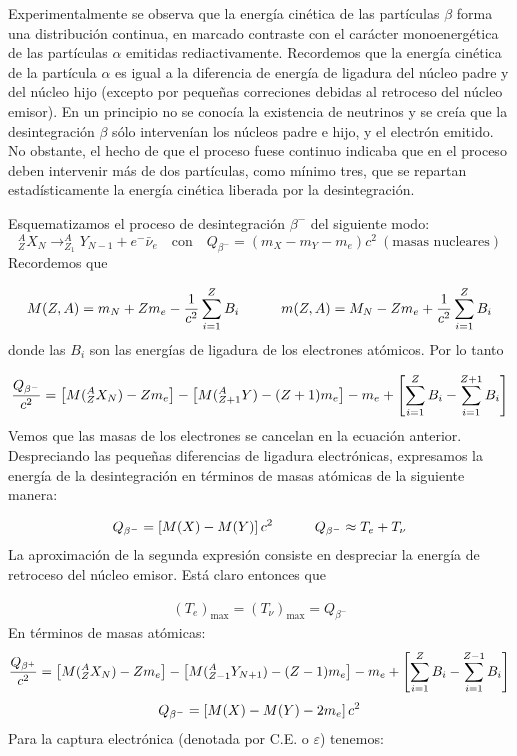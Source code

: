 Experimentalmente se observa que la energía cinética de las partículas $\beta$ forma una distribución continua, en marcado contraste con el carácter monoenergética de las partículas $\alpha$ emitidas rediactivamente. Recordemos que la energía cinética de la partícula $\alpha$ es igual a la diferencia de energía de ligadura del núcleo padre y del núcleo hijo (excepto por pequeñas correciones debidas al retroceso del núcleo emisor). En un principio no se conocía la existencia de neutrinos y se creía que la desintegración $\beta$ sólo intervenían los núcleos padre e hijo, y el electrón emitido. No obstante, el hecho de que el proceso fuese continuo indicaba que en el proceso deben intervenir más de dos partículas, como mínimo tres, que se repartan estadísticamente la energía cinética liberada por la desintegración. 

Esquematizamos el proceso de desintegración $\beta^-$ del siguiente modo:
\begin{equation}
	^A_Z X_N \longrightarrow _{Z_1}^A Y_{N-1} + e^- \bar{\nu}_e \quad \text{con} \quad Q_{\beta^-} = (m_X-m_Y-m_e)c^2 \ (\text{masas nucleares})
\end{equation}
Recordemos que

\begin{equation*}
	M(Z,A) = m_N + Zm_e - \frac{1}{c^2} \sum_{i=1}^Z B_i \quad \quad \quad
	m(Z,A) = M_N - Zm_e + \frac{1}{c^2} \sum_{i=1}^Z B_i
\end{equation*}
donde las $B_i$ son las energías de ligadura de los electrones atómicos. Por lo tanto

\begin{eqnarray}
	\frac{Q_{\beta^-}}{c^2} = \left[ M(^A_ZX_N) - Zm_e \right] - \left[ M(_{Z+1}^A Y)-(Z+1)m_e \right]  - m_e + \left[ \sum_{i=1}^{Z} B_i - \sum_{i=1}^{Z+1} B_i \right]
\end{eqnarray}
Vemos que las masas de los electrones se cancelan en la ecuación anterior. Despreciando las pequeñas diferencias de ligadura electrónicas, expresamos la energía de la desintegración en términos de masas atómicas de la siguiente manera:

\begin{eqnarray}
	Q_ {\beta^-} = \left[ M(X)-M(Y) \right] c^2 \quad \quad \quad Q_{\beta^-} \approx T_e + T_\nu
\end{eqnarray}
La aproximación de la segunda expresión consiste en despreciar la energía de retroceso del núcleo emisor. Está claro entonces que

\begin{eqnarray}
	(T_e)_{\max} = (T_\nu)_{\max} = Q_{\beta^-}
\end{eqnarray}
En términos de masas atómicas:
\begin{eqnarray}
	\frac{Q_{\beta^+}}{c^2} = \left[ M(^A_ZX_N) - Zm_e \right] - \left[ M(_{Z-1}^A Y_ {N+1})-(Z-1)m_e \right]  - m_e + \left[ \sum_{i=1}^{Z} B_i - \sum_{i=1}^{Z-1} B_i \right]
\end{eqnarray}
\begin{eqnarray}
	Q_ {\beta^-} = \left[ M(X)-M(Y)-2m_e \right] c^2 
\end{eqnarray}
Para la captura electrónica (denotada por C.E. o $\varepsilon$) tenemos:

